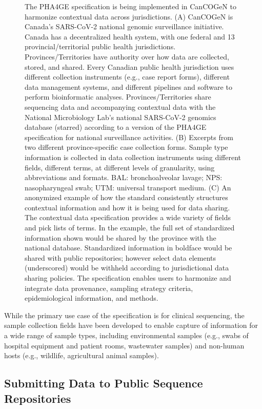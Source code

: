 \begin{figure}[h!]
\caption{The PHA4GE specification is being implemented in CanCOGeN to harmonize contextual data across jurisdictions. (A) CanCOGeN is Canada's SARS-CoV-2 national genomic surveillance initiative. Canada has a decentralized health system, with one federal and 13 provincial/territorial public health jurisdictions. Provinces/Territories have authority over how data are collected, stored, and shared. Every Canadian public health jurisdiction uses different collection instruments (e.g., case report forms), different data management systems, and different pipelines and software to perform bioinformatic analyses. Provinces/Territories share sequencing data and accompanying contextual data with the National Microbiology Lab's national SARS-CoV-2 genomics database (starred) according to a version of the PHA4GE specification for national surveillance activities. (B) Excerpts from two different province-specific case collection forms. Sample type information is collected in data collection instruments using different fields, different terms, at different levels of granularity, using abbreviations and formats. BAL: bronchoalveolar lavage; NPS: nasopharyngeal swab; UTM: universal transport medium. (C) An anonymized example of how the standard consistently structures contextual information and how it is being used for data sharing. The contextual data specification provides a wide variety of fields and pick lists of terms. In the example, the full set of standardized information shown would be shared by the province with the national database. Standardized information in boldface would be shared with public repositories; however select data elements (underscored) would be withheld according to jurisdictional data sharing policies. The specification enables users to harmonize and integrate data provenance, sampling strategy criteria, epidemiological information, and methods.}
\label{fig:chap7_figure_2}
\end{figure}

While the primary use case of the specification is for clinical sequencing, the sample collection fields have been developed to enable capture of information for a wide range of sample types, including environmental samples (e.g., swabs of hospital equipment and patient rooms, wastewater samples) and non-human hosts (e.g., wildlife, agricultural animal samples).

\subsection{Submitting Data to Public Sequence Repositories }

